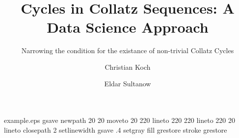 %
%
%
%
%
\begin{filecontents*}{example.eps}
gsave
newpath
  20 20 moveto
  20 220 lineto
  220 220 lineto
  220 20 lineto
closepath
2 setlinewidth
gsave
  .4 setgray fill
grestore
stroke
grestore
\end{filecontents*}
%
\RequirePackage{fix-cm}
%
\documentclass[smallextended]{svjour3}       %
%
\smartqed  %
%
\usepackage{graphicx}
\usepackage{amssymb}
\usepackage{amsmath}
%
%
%
%
%


\title{Cycles in Collatz Sequences: A Data Science Approach%
}
\subtitle{Narrowing the condition for the existance of non-trivial Collatz Cycles}


\author{Christian Koch         \and
        Eldar Sultanow
}



